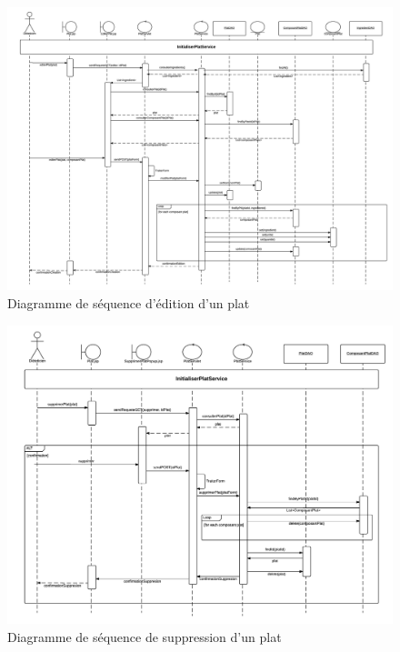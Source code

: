 \begin{figure}
\centering
\includegraphics[scale=0.4]{../../CasDUtilisations/CompositionPlat/sequence_EditerPlat.png}
\caption{Diagramme de séquence d'édition d'un plat}
\label{SequenceEditerPlat}
\end{figure}

\begin{figure}
\centering
\includegraphics[scale=0.5]{../../CasDUtilisations/CompositionPlat/sequence_SupprimerPlat.png}
\caption{Diagramme de séquence de suppression d'un plat}
\label{SequenceSupprimerPlat}
\end{figure}

